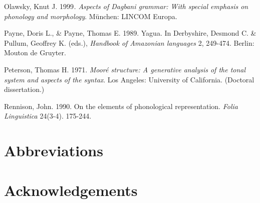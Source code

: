 \documentclass[output=paper]{langsci/langscibook}
\begin{document}
Olawsky, Knut J. 1999\textit{. Aspects of Dagbani grammar: With special emphasis on phonology and morphology}. M\"{u}nchen: LINCOM Europa.

Payne, Doris L., \& Payne, Thomas E. 1989. Yagua. In Derbyshire, Desmond C. \& Pullum, Geoffrey K. (eds.), \textit{Handbook of Amazonian languages} 2, 249-474. Berlin: Mouton de Gruyter.

Peterson, Thomas H. 1971. \textit{Mooré structure: A generative analysis of the tonal system and aspects of the syntax}. Los Angeles: University of California. (Doctoral dissertation.) 

Rennison, John. 1990.  On the elements of phonological representation. \textit{Folia Linguistica} 24(3-4). 175-244. 



\section*{Abbreviations}
\section*{Acknowledgements}

{\sloppy
\printbibliography[heading=subbibliography,notkeyword=this]
}
\end{document}
